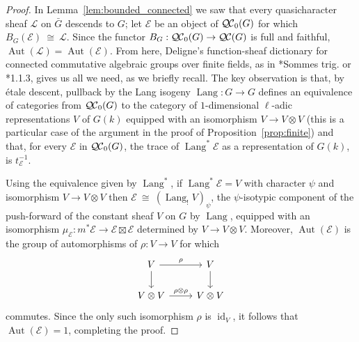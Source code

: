 \documentclass[CM,Submssn,SecEq]{degruyter-crelle} %
\theoremstyle{plain}
\theoremstyle{definition}
\theoremstyle{remark}
\newcommand{\Fq}{k}
\DeclareMathOperator{\Aut}{Aut}
\DeclareMathOperator{\id}{id}
\DeclareMathOperator{\Lang}{Lang}
\newcommand{\iso}{{\ \cong\ }}
\newcommand{\trFrob}[1]{t_{#1}}
\newcommand{\qcs}[1]{{\mathcal{#1}}}
\newcommand{\QC}{{\mathcal{Q\hskip-0.8pt C}}}
\newcommand{\bQC}{{\QC_0}}
\newcommand{\bG}{\bar{G}}
\begin{document}
\begin{proof}
In Lemma~\ref{lem:bounded_connected} we saw that every quasicharacter sheaf $\qcs{L}$ on $\bG$ descends to $G$; let $\qcs{E}$ be an object of $\bQC(G)$ for which $B_G(\qcs{E}) \iso \qcs{L}$.
 Since the functor $B_G : \bQC(G) \to \QC(G)$ is full and faithful, $\Aut(\qcs{L}) = \Aut(\qcs{E})$.
From here, Deligne's function-sheaf dictionary for connected commutative algebraic groups over finite fields, as in \cite{deligne:SGA4.5}*{Sommes trig.} or \cite{laumon:87a}*{1.1.3}, gives us all we need, as we briefly recall. %
The key observation is that, by \'etale descent, pullback by the Lang isogeny $\Lang : G\to G$ defines an equivalence of categories from $\bQC(G)$ to the category of $1$-dimensional $\ell$-adic representations $V$ of $G(\Fq)$ equipped with an isomorphism $V \to V\otimes V$ (this is a particular case of the argument in the proof of Proposition~\ref{prop:finite}) and that, for every $\qcs{E}$ in $\bQC(G)$, the trace of $\Lang^*\qcs{E}$ as a representation of $G(\Fq)$, is $\trFrob{\qcs{E}}^{-1}$.

Using the equivalence given by $\Lang^*$, if $\Lang^*\qcs{E} = V$ with character $\psi$ and isomorphism $V\to V\otimes V$ then 
$\qcs{E} \iso (\Lang_! V)_\psi$, the $\psi$-isotypic component of the push-forward of the constant sheaf $V$ on $G$ by $\Lang$, equipped with an isomorphism $\mu_\qcs{E} : m^* \qcs{E} \to \qcs{E} \boxtimes\qcs{E}$ determined by $V\to V\otimes V$. 
Moreover, $\Aut(\qcs{E})$ is the group of automorphisms of $\rho : V\to V$ for which 
\[
\begin{tikzcd}
\arrow{d}{} V \arrow{r}{\rho} & V\arrow{d}{}\\
V\otimes V \arrow{r}{\rho\otimes \rho} & V\otimes V
\end{tikzcd}
\]
commutes. 
Since the only such isomorphism $\rho$ is $\id_V$, it follows that $\Aut(\qcs{E}) = 1$, completing the proof.
\end{proof}
\end{document}
